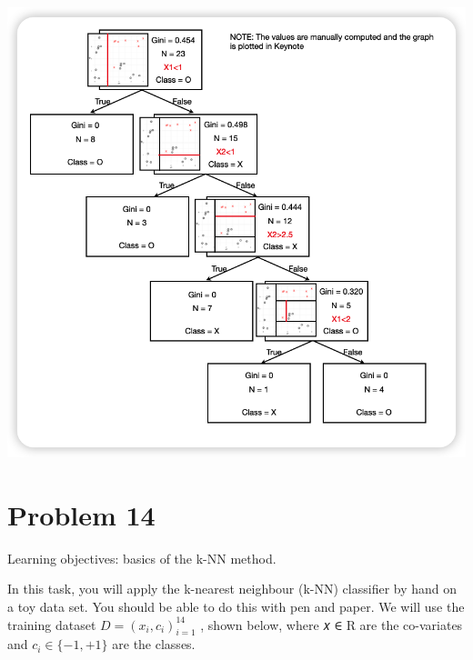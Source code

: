\documentclass[
]{article}
\begin{document}
\includegraphics[width=11.75in]{data/tree}

\hypertarget{problem-14}{%
\section{Problem 14}\label{problem-14}}

Learning objectives: basics of the k-NN method.

In this task, you will apply the k-nearest neighbour (k-NN) classifier
by hand on a toy data set. You should be able to do this with pen and
paper. We will use the training dataset \(D = {(x_i, c_i)}_{i=1}^{14}\)
, shown below, where 𝑥 ∈ R are the co-variates and
\(c_i \in \{-1, +1\}\) are the classes.
\end{document}
